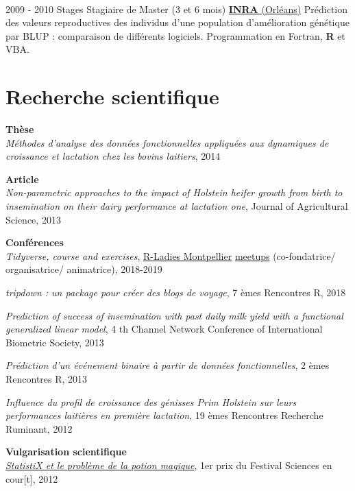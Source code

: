 \documentclass[letterpaper]{twentysecondcv} %
\begin{document}
\begin{twenty}
{        }
     \\
     \twentyitem
   		{2009 - 2010}
		{Stages}
        {Stagiaire de Master \textnormal{(3 et 6 mois)}}
        {\href{https://www6.val-de-loire.inra.fr/biofora}{\textbf{INRA} (Orléans)}}
        {}
        {Prédiction des valeurs reproductives des individus d’une population d’amélioration génétique par BLUP : comparaison de différents logiciels. Programmation en Fortran, \textbf{R} et VBA.
    	}
        
\end{twenty}

\vspace{5mm} 

\section{Recherche scientifique}
\textbf{Thèse} \\ 
\textit{Méthodes d'analyse des données fonctionnelles appliquées aux dynamiques de croissance et lactation chez les bovins laitiers}, 2014

\textbf{Article} \\ 
\textit{Non-parametric approaches to the impact of Holstein heifer growth from birth to insemination on their dairy performance at lactation one}, Journal of Agricultural Science,  2013 

\textbf{Conférences} \\ 
\textit{Tidyverse, course and exercises}, \href{https://twitter.com/RLadiesMontpel}{R-Ladies Montpellier} \href{https://www.meetup.com/fr-FR/rladies-montpellier/}{meetups} (co-fondatrice/ organisatrice/ animatrice), 2018-2019

\textit{tripdown : un package pour créer des blogs de voyage}, 7 èmes Rencontres R, 2018

\textit{Prediction of success of insemination with past daily milk yield with a functional generalized linear model}, 4 th Channel Network Conference of International Biometric Society, 2013

\textit{Prédiction d'un événement binaire à partir de données fonctionnelles}, 2 èmes Rencontres R, 2013

\textit{Influence du profil de croissance des génisses Prim Holstein sur leurs performances laitières en première
lactation}, 19 èmes Rencontres Recherche Ruminant, 2012 

\textbf{Vulgarisation scientifique}\\
\href{https://www.youtube.com/watch?v=QAT0F__A258}{\textit{StatistiX et le problème de la potion magique}}, 1er prix du Festival Sciences en cour[t], 2012
\end{document}
